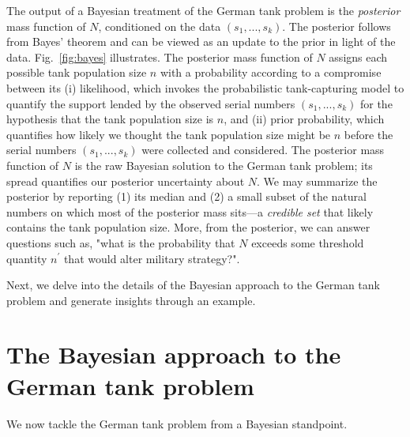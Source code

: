 \documentclass[11pt, oneside]{article}
\newcommand{\data}{$(s_1, ..., s_k)$\xspace}
\begin{document}
The output of a Bayesian treatment of the German tank problem is the \emph{posterior} mass function of $N$, conditioned on the data \data. The posterior follows from Bayes' theorem and can be viewed as an update to the prior in light of the data. Fig.~\ref{fig:bayes} illustrates.
The posterior mass function of $N$ assigns each possible tank population size $n$ with a probability according to a compromise between its
(i) likelihood, which invokes the probabilistic tank-capturing model to quantify the support lended by the observed serial numbers \data for the hypothesis that the tank population size is $n$, 
and 
(ii) prior probability, which quantifies how likely we thought the tank population size might be $n$ before the serial numbers \data were collected and considered. \cite{van2021bayesian} 
The posterior mass function of $N$ is the raw Bayesian solution to the German tank problem; its spread quantifies our posterior uncertainty about $N$. We may summarize the posterior by reporting (1) its median and (2) a small subset of the natural numbers on which most of the posterior mass sits---a \emph{credible set} that likely contains the tank population size. More, from the posterior, we can answer questions such as, "what is the probability that $N$ exceeds some threshold quantity $n^\prime$ that would alter military strategy?".

Next, we delve into the details of the Bayesian approach to the German tank problem and generate insights through an example. 


\section{The Bayesian approach to the German tank problem}
We now tackle the German tank problem from a Bayesian standpoint. 
\end{document}

